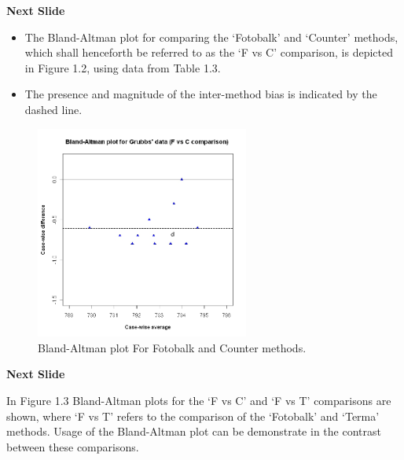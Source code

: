 \documentclass[compress]{beamer}        %
\begin{document}
\begin{frame}
\textbf{Next Slide}
\begin{itemize}
\item The Bland-Altman plot for comparing the `Fotobalk' and `Counter'
methods, which shall henceforth be referred to as the `F vs C'
comparison,  is depicted in Figure 1.2, using data from Table 1.3.
\item The presence and magnitude of the inter-method bias is indicated
by the dashed line.
\end{itemize}
\end{frame}
\begin{frame}
\begin{figure}[h!]
\begin{center}
  \includegraphics[width=70mm]{GrubbsBAplot-noLOA.jpeg}
  \caption{Bland-Altman plot For Fotobalk and Counter methods.}\label{GrubbsBA-noLOA}
\end{center}
\end{figure}
\end{frame}
\begin{frame}
\textbf{Next Slide}

In Figure 1.3 Bland-Altman plots for the `F vs C' and `F vs T'
comparisons are shown, where `F vs T' refers to the comparison of
the `Fotobalk' and `Terma' methods. Usage of the Bland-Altman plot
can be demonstrate in the contrast between these comparisons.
\end{frame}
\end{document}
